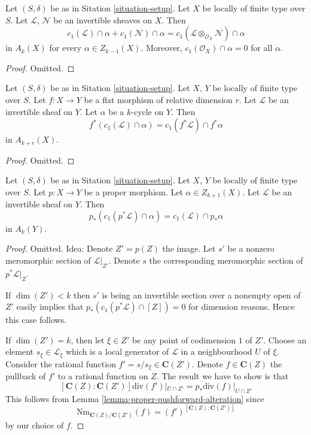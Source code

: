\begin{lemma}
\label{lemma-c1-cap-additive}
Let $(S, \delta)$ be as in Sitation \ref{situation-setup}.
Let $X$ be locally of finite type over $S$.
Let $\mathcal{L}$, $\mathcal{N}$ be an invertible sheaves on $X$.
Then
$$
c_1(\mathcal{L}) \cap \alpha  + c_1(\mathcal{N}) \cap \alpha =
c_1(\mathcal{L} \otimes_{\mathcal{O}_X} \mathcal{N}) \cap \alpha
$$
in $A_k(X)$ for every $\alpha \in Z_{k - 1}(X)$. Moreover, 
$c_1(\mathcal{O}_X) \cap \alpha = 0$ for all $\alpha$.
\end{lemma}

\begin{proof}
Omitted.
\end{proof}

\begin{lemma}
\label{lemma-flat-pullback-cap-c1}
Let $(S, \delta)$ be as in Sitation \ref{situation-setup}.
Let $X$, $Y$ be locally of finite type over $S$.
Let $f : X \to Y$ be a flat morphism of relative dimension $r$.
Let $\mathcal{L}$ be an invertible sheaf on $Y$.
Let $\alpha$ be a $k$-cycle on $Y$.
Then
$$
f^*(c_1(\mathcal{L}) \cap \alpha) = c_1(f^*\mathcal{L}) \cap f^*\alpha
$$
in $A_{k + r}(X)$.
\end{lemma}

\begin{proof}
Omitted.
\end{proof}

\begin{lemma}
\label{lemma-pushforward-cap-c1}
Let $(S, \delta)$ be as in Sitation \ref{situation-setup}.
Let $X$, $Y$ be locally of finite type over $S$.
Let $p : X \to Y$ be a proper morphism.
Let $\alpha \in Z_{k + 1}(X)$.
Let $\mathcal{L}$ be an invertible sheaf on $Y$.
Then
$$
p_*(c_1(p^*\mathcal{L}) \cap \alpha) = c_1(\mathcal{L}) \cap p_*\alpha
$$
in $A_k(Y)$.
\end{lemma}

\begin{proof}
Omitted. Idea: Denote $Z' = p(Z)$ the image. Let $s'$ be a nonzero
meromorphic section of $\mathcal{L}|_{Z'}$. Denote $s$ the corresponding
meromorphic section of $p^*\mathcal{L}|_Z$. 

\medskip\noindent
If $\dim(Z') < k$ then $s'$ is being an invertible section  over a nonempty
open of $Z'$ easily implies that $p_*(c_1(p^*\mathcal{L}) \cap [Z]) = 0$
for dimension reasons. Hence this case follows.

\medskip\noindent
If $\dim(Z') = k$, then let $\xi \in Z'$ be any point of codimension
$1$ of $Z'$. Choose an element $s_\xi \in \mathcal{L}_\xi$ which
is a local generator of $\mathcal{L}$ in a neighbourhood $U$ of $\xi$.
Consider the rational function $f' = s/s_{\xi} \in \mathbf{C}(Z')$.
Denote $f \in \mathbf{C}(Z)$ the pullback of $f'$ to a rational function on
$Z$. The result we have to show is that
$$
[\mathbf{C}(Z) : \mathbf{C}(Z')] \text{div}(f')|_{U \cap Z'} =
p_*\text{div}(f)|_{U \cap Z'}
$$
This follows from Lemma \ref{lemma-proper-pushforward-alteration} since
$$
\text{Nm}_{\mathbf{C}(Z)/\mathbf{C}(Z')}(f)
=
(f')^{[\mathbf{C}(Z) : \mathbf{C}(Z')]}
$$
by our choice of $f$.
\end{proof}

